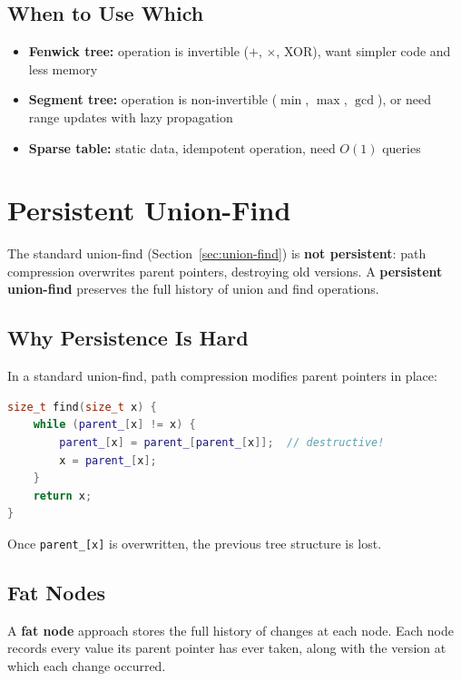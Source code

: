 \subsection{When to Use Which}

\begin{itemize}
    \item \textbf{Fenwick tree:} operation is invertible ($+$, $\times$, XOR), want simpler code and less memory
    \item \textbf{Segment tree:} operation is non-invertible ($\min$, $\max$, $\gcd$), or need range updates with lazy propagation
    \item \textbf{Sparse table:} static data, idempotent operation, need $O(1)$ queries
\end{itemize}

\section{Persistent Union-Find}
\label{sec:persistent-uf}

The standard union-find (Section~\ref{sec:union-find}) is \textbf{not persistent}: path compression overwrites parent pointers, destroying old versions. A \textbf{persistent union-find} preserves the full history of union and find operations.

\subsection{Why Persistence Is Hard}

In a standard union-find, path compression modifies parent pointers in place:

\begin{lstlisting}[language=C++]
size_t find(size_t x) {
    while (parent_[x] != x) {
        parent_[x] = parent_[parent_[x]];  // destructive!
        x = parent_[x];
    }
    return x;
}
\end{lstlisting}

Once \texttt{parent\_[x]} is overwritten, the previous tree structure is lost.

\subsection{Fat Nodes}

A \textbf{fat node} approach stores the full history of changes at each node. Each node records every value its parent pointer has ever taken, along with the version at which each change occurred.

